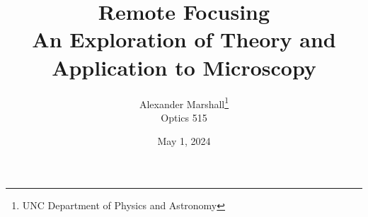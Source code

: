 \documentclass{article}
\begin{document}
\title{\textbf{\Huge{Remote Focusing}\\ \Large{An Exploration of Theory and Application to Microscopy}}}
\author{\Large{Alexander Marshall\thanks{UNC Department of Physics and Astronomy}}\\ \Large{Optics 515}}
\date{\Large{May 1, 2024}}


\end{document}
